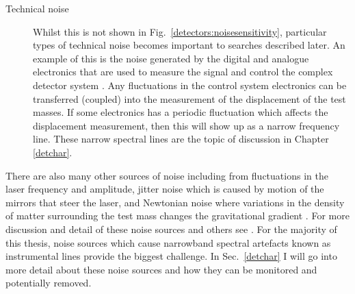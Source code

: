 \begin{description}
\item[Technical noise] Whilst this is not shown
in Fig.~\ref{detectors:noisesensitivity}, particular types of technical noise becomes important to searches
described later. An example of this is the noise generated by the digital and analogue electronics that are used to measure the signal and control the complex
detector system \citep{martynov2016SensitivityAdvanced}. Any fluctuations in the control system electronics can be transferred (coupled) into the measurement of the displacement of the test masses. 
If some electronics has a periodic fluctuation which affects the displacement measurement, then this will show up as a narrow frequency line. These narrow spectral lines are the topic of discussion in Chapter \ref{detchar}.

\end{description}

There are also many other sources of noise including from fluctuations in the laser frequency and amplitude, jitter noise which is caused by motion of the mirrors that steer the laser, and Newtonian noise where variations in the density of matter surrounding the test mass changes the gravitational gradient \citep{martynov2016SensitivityAdvanced}.
For more discussion and detail of these noise sources and others see \citep{martynov2016SensitivityAdvanced,aasi2015AdvancedLIGO,aasi2015CharacterizationLIGO}. 
For the majority of this thesis, noise sources which cause narrowband spectral artefacts known as instrumental lines provide the biggest challenge.  In Sec.~\ref{detchar} I will go into more detail about these noise sources and how they can be monitored and potentially removed.













